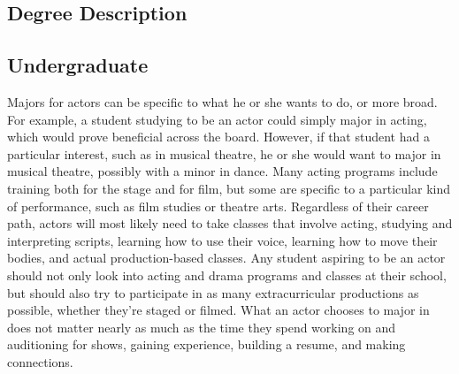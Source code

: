 \begin{multicols}{2}

\section{Degree Description}
	\subsection{Undergraduate}
		Majors for actors can be specific to what he or she wants to do, or more broad. For example, a student studying to be an actor could simply major in acting, which would prove beneficial across the board. However, if that student had a particular interest, such as in musical theatre, he or she would want to major in musical theatre, possibly with a minor in dance. Many acting programs include training both for the stage and for film, but some are specific to a particular kind of performance, such as film studies or theatre arts. Regardless of their career path, actors will most likely need to take classes that involve acting, studying and interpreting scripts, learning how to use their voice, learning how to move their bodies, and actual production-based classes. Any student aspiring to be an actor should not only look into acting and drama programs and classes at their school, but should also try to participate in as many extracurricular productions as possible, whether they’re staged or filmed. What an actor chooses to major in does not matter nearly as much as the time they spend working on and auditioning for shows, gaining experience, building a resume, and making connections.

\end{multicols}
